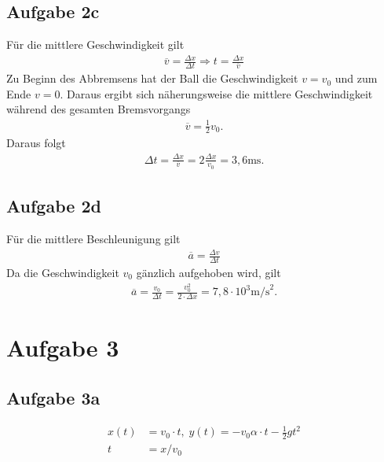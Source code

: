 \documentclass[a4paper,11pt]{article}
\begin{document}
\subsection*{Aufgabe 2c}
Für die mittlere Geschwindigkeit gilt
\begin{align*}
  \overline{v} = \frac{\Delta x}{\Delta t} \Rightarrow t = \frac{\Delta x}{\overline{v}}
\end{align*}
Zu Beginn des Abbremsens hat der Ball die Geschwindigkeit $v = v_0$ und zum Ende $v = 0$. Daraus ergibt sich näherungsweise die mittlere Geschwindigkeit während des gesamten Bremsvorgangs
\begin{align*}
  \overline{v} = \frac{1}{2} v_0 \mbox{.}
\end{align*}
Daraus folgt
\begin{align*}
  \Delta t = \frac{\Delta x}{\overline{v}} = 2\frac{\Delta x}{v_0} = 3,6 \mbox{ms.}
\end{align*}

\subsection*{Aufgabe 2d}
Für die mittlere Beschleunigung gilt
\begin{align*}
  \overline{a} = \frac{\Delta v}{\Delta t}
\end{align*}
Da die Geschwindigkeit $v_0$ gänzlich aufgehoben wird, gilt
\begin{align*}
  \overline{a} = \frac{v_0}{\Delta t} = \frac{v_0^2}{2\cdot\Delta x} = 7,8\cdot 10^3 \mbox{m/s}^2\mbox{.}
\end{align*}


\section*{Aufgabe 3}
\subsection*{Aufgabe 3a}
\begin{align*}
  x(t) &= v_0 \cdot t\mbox{,}~~y(t)=-v_0\alpha\cdot t - \frac{1}{2}gt^2\\
  t &= x / v_0
\end{align*}
\end{document}
